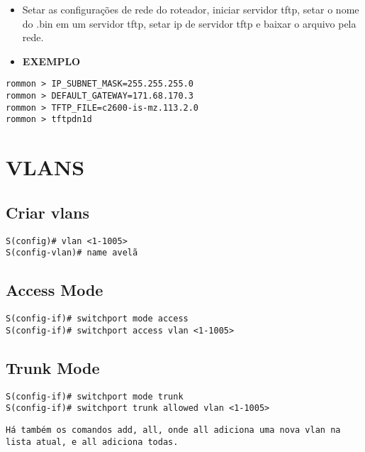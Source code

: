\documentclass[]{article}
\begin{document}
\begin{itemize}
\item
  Setar as configurações de rede do roteador, iniciar servidor tftp,
  setar o nome do .bin em um servidor tftp, setar ip de servidor tftp e
  baixar o arquivo pela rede.
\item
  \textbf{EXEMPLO}
\end{itemize}

\begin{verbatim}
rommon > IP_SUBNET_MASK=255.255.255.0
rommon > DEFAULT_GATEWAY=171.68.170.3
rommon > TFTP_FILE=c2600-is-mz.113.2.0
rommon > tftpdn1d
\end{verbatim}

\hypertarget{vlans}{%
\section{VLANS}\label{vlans}}

\hypertarget{criar-vlans}{%
\subsection{Criar vlans}\label{criar-vlans}}

\begin{verbatim}
S(config)# vlan <1-1005>
S(config-vlan)# name avelã
\end{verbatim}

\hypertarget{access-mode}{%
\subsection{Access Mode}\label{access-mode}}

\begin{verbatim}
S(config-if)# switchport mode access
S(config-if)# switchport access vlan <1-1005>
\end{verbatim}

\hypertarget{trunk-mode}{%
\subsection{Trunk Mode}\label{trunk-mode}}

\begin{verbatim}
S(config-if)# switchport mode trunk
S(config-if)# switchport trunk allowed vlan <1-1005>
\end{verbatim}

\begin{verbatim}
Há também os comandos add, all, onde all adiciona uma nova vlan na lista atual, e all adiciona todas.
\end{verbatim}
\end{document}

